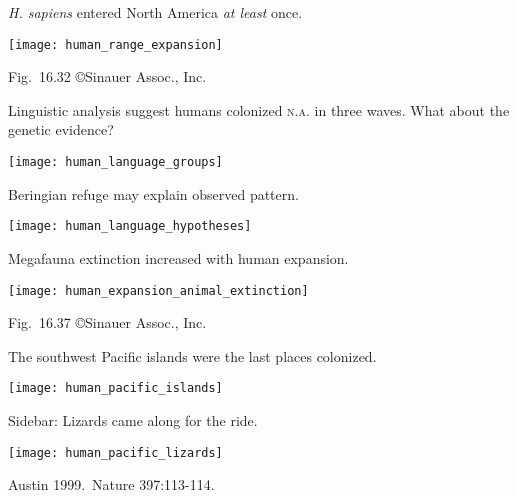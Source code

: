 \documentclass[t]{beamer}
\begin{document}
%
\begin{frame}{\textit{H. sapiens} entered North America \emph{at least} once.}
	\vspace{-\baselineskip}
	\begin{center}
		\texttt{[image: human\_range\_expansion]}
	\end{center}

	\vfilll
	
	\hfill \tiny Fig.~16.32 \copyright Sinauer Assoc., Inc.
\end{frame}
%
\begin{frame}{Linguistic analysis suggest humans colonized \textsc{n.a.} in three waves. What about the genetic evidence?}
	\vspace{-0.5\baselineskip}
	\begin{center}
		\texttt{[image: human\_language\_groups]}
	\end{center}
\end{frame}
%
\begin{frame}[t]{Beringian refuge may explain observed pattern.}
	\vspace{-\baselineskip}
	\begin{center}
		\texttt{[image: human\_language\_hypotheses]}
	\end{center}
\end{frame}
%
\begin{frame}[t]{Megafauna extinction increased with human expansion.}
	\vspace{-\baselineskip}
	\begin{center}
		\texttt{[image: human\_expansion\_animal\_extinction]}
	\end{center}

	\vfilll
	
	\hfill \tiny Fig.~16.37 \copyright Sinauer Assoc., Inc.
	
\end{frame}
%
\begin{frame}{The southwest Pacific islands were the last places colonized.}
	\vspace{-\baselineskip}
	\begin{center}
		\texttt{[image: human\_pacific\_islands]}
	\end{center}
\end{frame}
%
\begin{frame}{Sidebar: Lizards came along for the ride.}
	\vspace{-\baselineskip}
	\begin{center}
		\texttt{[image: human\_pacific\_lizards]}
	\end{center}

	\hfill \tiny Austin 1999.~Nature 397:113-114.
\end{frame}
\end{document}

